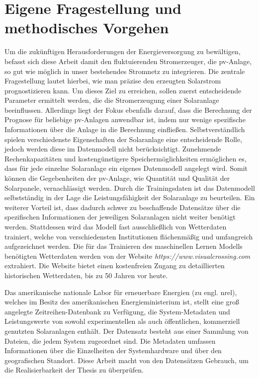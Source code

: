 \documentclass[12pt, a4paper]{article}
\begin{document}
\newpage

\section{Eigene Fragestellung und methodisches Vorgehen}

Um die zukünftigen Herausforderungen der Energieversorgung zu bewältigen, befasst sich diese Arbeit damit den fluktuierenden Stromerzeuger, die \ac{pv}-Anlage, so gut wie möglich in unser bestehendes Stromnetz zu integrieren. Die zentrale Fragestellung lautet hierbei, wie man präzise den erzeugten Solarstrom prognostizieren kann. Um dieses Ziel zu erreichen, sollen zuerst entscheidende Parameter ermittelt werden, die die Stromerzeugung einer Solaranlage beeinflussen. Allerdings liegt der Fokus ebenfalls darauf, dass die Berechnung der Prognose für beliebige \ac{pv}-Anlagen anwendbar ist, indem nur wenige spezifische Informationen über die Anlage in die Berechnung einfließen. Selbstverständlich spielen verschiedenste Eigenschaften der Solaranlage eine entscheidende Rolle, jedoch werden diese im Datenmodell nicht berücksichtigt. Zunehmende Rechenkapazitäten und kostengünstigere Speichermöglichkeiten ermöglichen es, dass für jede einzelne Solaranlage ein eigenes Datenmodell angelegt wird. Somit können die Gegebenheiten der \ac{pv}-Anlage, wie Quantität und Qualität der Solarpanele, vernachlässigt werden. Durch die Trainingsdaten ist das Datenmodell selbstständig in der Lage die Leistungsfähigkeit der Solaranlage zu beurteilen. Ein weiterer Vorteil ist, dass dadurch schwer zu beschaffende Datensätze über die spezifischen Informationen der jeweiligen Solaranlagen nicht weiter benötigt werden. Stattdessen wird das Modell fast ausschließlich von Wetterdaten trainiert, welche von verschiedensten Institutionen flächenmäßig und umfangreich aufgezeichnet werden. Die für das Trainieren des maschinellen Lernen Modells benötigten Wetterdaten werden von der Website \textit{https://www.visualcrossing.com} extrahiert. Die Website bietet einen kostenfreien Zugang zu detaillierten historischen Wetterdaten, bis zu 50 Jahren vor heute. 

Das amerikanische nationale Labor für erneuerbare Energien (zu engl. \ac{nrel}), welches im Besitz des amerikanischen Energieministerium ist, stellt eine groß angelegte Zeitreihen-Datenbank zu Verfügung, die System-Metadaten und Leistungswerte von sowohl experimentellen als auch öffentlichen, kommerziell genutzten Solaranlagen enthält.  Der Datensatz besteht aus einer Sammlung von Dateien, die jedem System zugeordnet sind. Die Metadaten umfassen Informationen über die Einzelheiten der Systemhardware und über den geografischen Standort. Diese Arbeit macht von den Datensätzen Gebrauch, um die Realisierbarkeit der Thesis zu überprüfen. 
\end{document}

